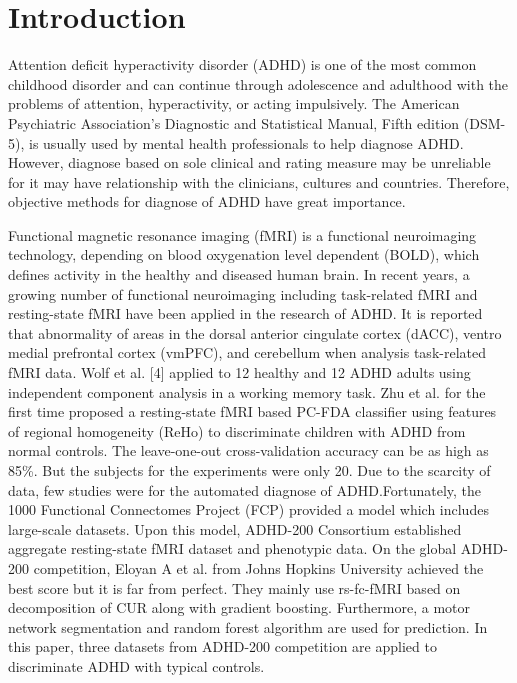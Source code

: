 \documentclass{llncs}
\begin{document}
\section{Introduction}
Attention deficit hyperactivity disorder (ADHD) is one of the most common childhood disorder and can continue through adolescence and adulthood with the problems of attention, hyperactivity, or acting impulsively\cite{1}. The American Psychiatric Association's Diagnostic and Statistical Manual, Fifth edition (DSM-5)\cite{2}, is usually used by mental health professionals to help diagnose ADHD. However, diagnose based on sole clinical and rating measure may be unreliable for it may have relationship with the clinicians, cultures and countries. Therefore, objective methods for diagnose of ADHD have great importance.


Functional magnetic resonance imaging (fMRI) is a functional neuroimaging technology, depending on blood oxygenation level dependent (BOLD), which defines activity in the healthy and diseased human brain\cite{3}. In recent years, a growing number of functional neuroimaging including task-related fMRI and resting-state fMRI have been applied in the research of ADHD. It is reported that abnormality of areas in the dorsal anterior cingulate cortex (dACC), ventro medial prefrontal cortex (vmPFC), and cerebellum when analysis task-related fMRI data\cite{4}\cite{5}. Wolf et al. [4] applied to 12 healthy and 12 ADHD adults using independent component analysis in a working memory task. Zhu et al\cite{6}. for the first time proposed a resting-state fMRI based PC-FDA classifier using features of regional homogeneity (ReHo) to discriminate children with ADHD from normal controls. The leave-one-out cross-validation accuracy can be as high as 85\%{}. But the subjects for the experiments were only 20. Due to the scarcity of data, few studies were for the automated diagnose of ADHD.Fortunately, the 1000 Functional Connectomes Project (FCP) provided a model which includes large-scale datasets\cite{7}. Upon this model, ADHD-200 Consortium established aggregate resting-state fMRI dataset and phenotypic data. On the global ADHD-200 competition, Eloyan A et al.\cite{8} from Johns Hopkins University achieved the best score but it is far from perfect. They mainly use rs-fc-fMRI based on decomposition of CUR along with gradient boosting. Furthermore, a motor network segmentation and random forest algorithm are used for prediction. In this paper, three datasets from ADHD-200 competition are applied to discriminate ADHD with typical controls. 
\end{document}

